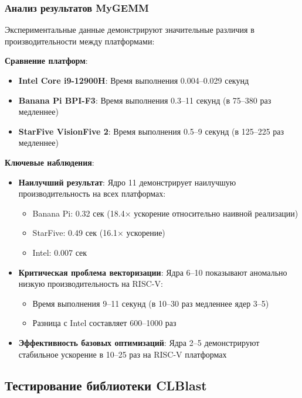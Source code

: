 \subsubsection{Анализ результатов MyGEMM}

Экспериментальные данные демонстрируют значительные различия в производительности между платформами:

\textbf{Сравнение платформ}:
\begin{itemize}
    \item \textbf{Intel Core i9-12900H}: Время выполнения 0.004--0.029 секунд
    \item \textbf{Banana Pi BPI-F3}: Время выполнения 0.3--11 секунд (в 75--380 раз медленнее)
    \item \textbf{StarFive VisionFive 2}: Время выполнения 0.5--9 секунд (в 125--225 раз медленнее)
\end{itemize}

\textbf{Ключевые наблюдения}:

\begin{itemize}
    \item \textbf{Наилучший результат}: Ядро 11 демонстрирует наилучшую производительность на всех платформах:
    \begin{itemize}
        \item Banana Pi: 0.32 сек (18.4× ускорение относительно наивной реализации)
        \item StarFive: 0.49 сек (16.1× ускорение)
        \item Intel: 0.007 сек
    \end{itemize}
    
    \item \textbf{Критическая проблема векторизации}: Ядра 6--10 показывают аномально низкую производительность на RISC-V:
    \begin{itemize}
        \item Время выполнения 9--11 секунд (в 10--30 раз медленнее ядер 3--5)
        \item Разница с Intel составляет 600--1000 раз
    \end{itemize}
    
    \item \textbf{Эффективность базовых оптимизаций}: Ядра 2--5 демонстрируют стабильное ускорение в 10--25 раз на RISC-V платформах
\end{itemize}

\subsection{Тестирование библиотеки CLBlast}

